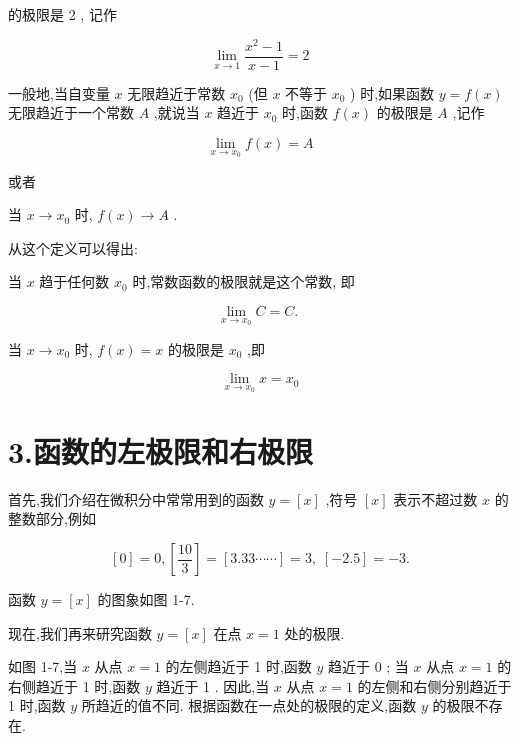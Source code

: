 \documentclass[lang=cn,newtx,10pt,scheme=chinese]{elegantbook}
\begin{document}
的极限是 2 , 记作

\[
\mathop{\lim }\limits_{{x \rightarrow 1}}\frac{{x}^{2} - 1}{x - 1} = 2
\]

\begin{definition} 

一般地,当自变量 \(x\) 无限趋近于常数 \({x}_{0}\) (但 \(x\) 不等于 \({x}_{0}\) ) 时,如果函数 \(y = f\left( x\right)\) 无限趋近于一个常数 \(A\) ,就说当 \(x\) 趋近于 \({x}_{0}\) 时,函数 \(f\left( x\right)\) 的极限是 \(A\) ,记作

\[
\mathop{\lim }\limits_{{x \rightarrow {x}_{0}}}f\left( x\right) = A
\]

或者

当 \(x \rightarrow {x}_{0}\) 时, \(f\left( x\right) \rightarrow A\) .

\end{definition}

从这个定义可以得出:

当 \(x\) 趋于任何数 \({x}_{0}\) 时,常数函数的极限就是这个常数, 即

\[
\mathop{\lim }\limits_{{x \rightarrow {x}_{0}}}C = C\text{. }
\]

当 \(x \rightarrow {x}_{0}\) 时, \(f\left( x\right) = x\) 的极限是 \({x}_{0}\) ,即

\[
\mathop{\lim }\limits_{{x \rightarrow {x}_{0}}}x = {x}_{0}
\]

\section*{3.函数的左极限和右极限}

首先,我们介绍在微积分中常常用到的函数 \(y = \left\lbrack x\right\rbrack\) ,符号 \(\left\lbrack x\right\rbrack\) 表示不超过数 \(x\) 的整数部分,例如

\[
\left\lbrack 0\right\rbrack = 0,\left\lbrack \frac{10}{3}\right\rbrack = \left\lbrack {{3.33}\cdots \cdots }\right\rbrack = 3,\;\left\lbrack {-{2.5}}\right\rbrack = - 3.
\]

函数 \(y = \left\lbrack x\right\rbrack\) 的图象如图 1-7.

现在,我们再来研究函数 \(y = \left\lbrack x\right\rbrack\) 在点 \(x = 1\) 处的极限.

如图 1-7,当 \(x\) 从点 \(x = 1\) 的左侧趋近于 1 时,函数 \(y\) 趋近于 0 ; 当 \(x\) 从点 \(x = 1\) 的右侧趋近于 1 时,函数 \(y\) 趋近于 1 . 因此,当 \(x\) 从点 \(x = 1\) 的左侧和右侧分别趋近于 1 时,函数 \(y\) 所趋近的值不同. 根据函数在一点处的极限的定义,函数 \(y\) 的极限不存在.
\end{document}
